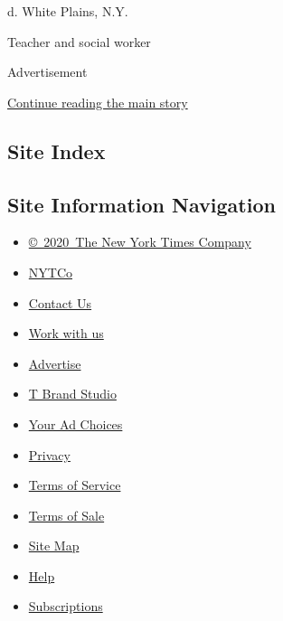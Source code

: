 d. White Plains, N.Y.

Teacher and social worker

Advertisement

\protect\hyperlink{after-bottom}{Continue reading the main story}

\hypertarget{site-index}{%
\subsection{Site Index}\label{site-index}}

\hypertarget{site-information-navigation}{%
\subsection{Site Information
Navigation}\label{site-information-navigation}}

\begin{itemize}
\tightlist
\item
  \href{https://help.nytimes3xbfgragh.onion/hc/en-us/articles/115014792127-Copyright-notice}{©~2020~The
  New York Times Company}
\end{itemize}

\begin{itemize}
\tightlist
\item
  \href{https://www.nytco.com/}{NYTCo}
\item
  \href{https://help.nytimes3xbfgragh.onion/hc/en-us/articles/115015385887-Contact-Us}{Contact
  Us}
\item
  \href{https://www.nytco.com/careers/}{Work with us}
\item
  \href{https://nytmediakit.com/}{Advertise}
\item
  \href{http://www.tbrandstudio.com/}{T Brand Studio}
\item
  \href{https://www.nytimes3xbfgragh.onion/privacy/cookie-policy\#how-do-i-manage-trackers}{Your
  Ad Choices}
\item
  \href{https://www.nytimes3xbfgragh.onion/privacy}{Privacy}
\item
  \href{https://help.nytimes3xbfgragh.onion/hc/en-us/articles/115014893428-Terms-of-service}{Terms
  of Service}
\item
  \href{https://help.nytimes3xbfgragh.onion/hc/en-us/articles/115014893968-Terms-of-sale}{Terms
  of Sale}
\item
  \href{https://spiderbites.nytimes3xbfgragh.onion}{Site Map}
\item
  \href{https://help.nytimes3xbfgragh.onion/hc/en-us}{Help}
\item
  \href{https://www.nytimes3xbfgragh.onion/subscription?campaignId=37WXW}{Subscriptions}
\end{itemize}
